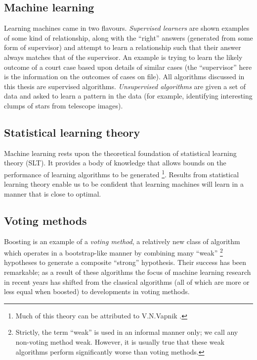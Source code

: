 \subsection{Machine learning}

Learning machines came in two flavours.  \emph{Supervised learners} are
shown examples of some kind of relationship, along with the ``right''
answers (generated from some form of supervisor) and attempt to learn a
relationship such that their answer always matches that of the
supervisor.  An example is trying to learn the likely outcome of a
court case based upon details of similar cases (the ``supervisor''
here is the information on the outcomes of cases on file).  All
algorithms discussed in this thesis are supervised algorithms.
\emph{Unsupervised algorithms} are given a set of data and asked to
learn a pattern in the data (for example, identifying interesting
clumps of stars from telescope images).


\subsection{Statistical learning theory}

Machine learning rests upon the theoretical foundation of statistical
learning theory (SLT).  It provides a body of knowledge that allows
bounds on the performance of learning algorithms to be generated%
\footnote{Much of this theory can be attributed to V.N.Vapnik
\cite{Vapnik98}.}.
Results from statistical learning theory enable us to be confident
that learning machines will learn in a manner that is close to optimal.

\subsection{Voting methods}

Boosting is an example of a \emph{voting method}, a relatively new
class of algorithm which operates in a bootstrap-like 
manner by combining many ``weak''%
\footnote{Strictly, the term ``weak'' is used in an informal manner
only; we call any non-voting method weak.  However, it is usually true
that these weak algorithms perform significantly worse than voting
methods.}
hypotheses to generate a composite ``strong'' hypothesis.  Their
success has been remarkable; as a result of these algorithms the
focus of machine learning research in recent years has shifted from
the classical algorithms (all of which are more or less equal when
boosted) to developments in voting methods.


